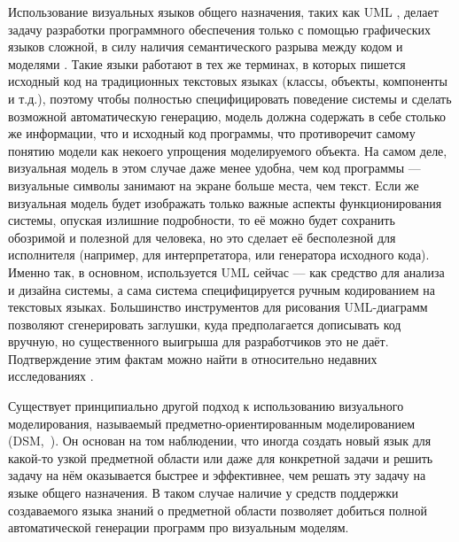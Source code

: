 Использование визуальных языков общего назначения, таких как \ac{UML}%
, делает задачу разработки программного обеспечения только с помощью графических языков сложной, 
в силу наличия семантического разрыва между кодом и моделями 
\cite{selic2003pragmatics, koznov2008osnovy}. Такие языки работают в 
тех же терминах, в которых пишется исходный код на традиционных текстовых языках 
(классы, объекты, компоненты и т.д.), поэтому чтобы полностью специфицировать 
поведение системы и сделать возможной автоматическую генерацию, модель должна 
содержать в себе столько же информации, что и исходный код программы, что 
противоречит самому понятию модели как некоего упрощения моделируемого объекта. 
На самом деле, визуальная модель в этом случае даже менее удобна, чем код 
программы --- визуальные символы занимают на экране больше места, чем текст. 
Если же визуальная модель будет изображать только важные аспекты 
функционирования системы, опуская излишние подробности, то её можно будет 
сохранить обозримой и полезной для человека, но это сделает её бесполезной для 
исполнителя (например, для интерпретатора, или генератора исходного кода). 
Именно так, в основном, используется \ac{UML} сейчас --- как средство для анализа и 
дизайна системы, а сама система специфицируется ручным кодированием на текстовых 
языках. Большинство инструментов для рисования UML-диаграмм позволяют 
сгенерировать заглушки, куда предполагается дописывать код вручную, но 
существенного выигрыша для разработчиков это не даёт. Подтверждение этим фактам 
можно найти в относительно недавних исследованиях 
\cite{mohagheghi2013empirical, chen2012methodology}.

Существует принципиально другой подход к использованию визуального 
моделирования, называемый предметно-ориентированным моделированием 
(\ac{DSM},~\cite{kelly2008domain}). Он основан на том 
наблюдении, что иногда создать новый язык для какой-то узкой предметной области 
или даже для конкретной задачи и решить задачу на нём оказывается быстрее и 
эффективнее, чем решать эту задачу на языке общего назначения. В таком случае 
наличие у средств поддержки создаваемого языка знаний о предметной области 
позволяет добиться полной автоматической генерации программ про визуальным 
моделям. 

